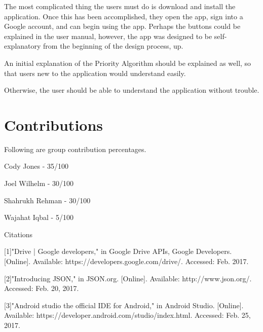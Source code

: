 \documentclass[12pt]{article}
\begin{document}
The most complicated thing the users must do is download and install the application. Once this has been accomplished, they open the app, sign into a Google account, and can begin using the app. Perhaps the buttons could be explained in the user manual, however, the app was designed to be self-explanatory from the beginning of the design process, up. 

An initial explanation of the Priority Algorithm should be explained as well, so that users new to the application would understand easily.

Otherwise, the user should be able to understand the application without trouble.


\section{Contributions}
Following are group contribution percentages.

Cody Jones - 35/100

Joel Wilhelm - 30/100

Shahrukh Rehman - 30/100

Wajahat Iqbal - 5/100

\newpage



Citations

[1]"Drive | Google developers," in Google Drive APIs, Google Developers. [Online]. Available: https://developers.google.com/drive/. Accessed: Feb. 2017.


[2]"Introducing JSON," in JSON.org. [Online]. Available: http://www.json.org/. Accessed: Feb. 20, 2017.


[3]"Android studio the official IDE for Android," in Android Studio. [Online]. Available: https://developer.android.com/studio/index.html. Accessed: Feb. 25, 2017.
\end{document}
